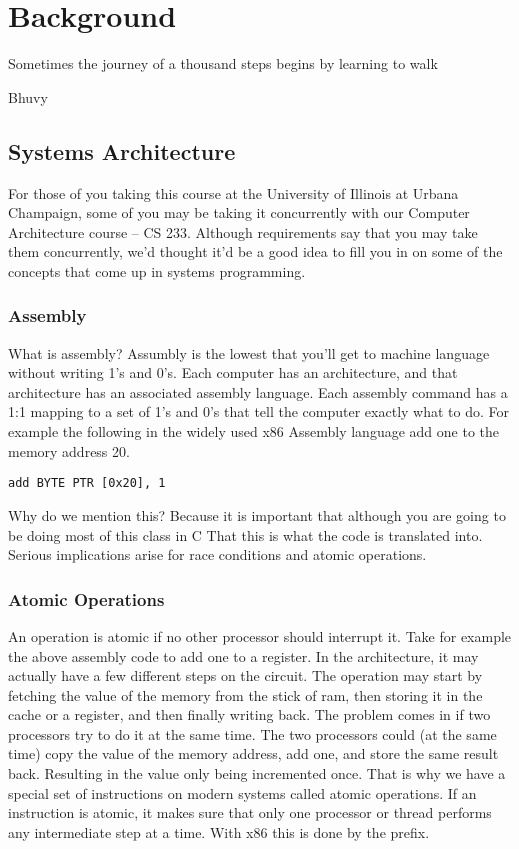 \chapter{Background}

\epigraph{Sometimes the journey of a thousand steps begins by learning to walk}{Bhuvy}

\section{Systems Architecture}

For those of you taking this course at the University of Illinois at Urbana Champaign, some of you may be taking it concurrently with our Computer Architecture course -- CS 233.
Although requirements say that you may take them concurrently, we'd thought it'd be a good idea to fill you in on some of the concepts that come up in systems programming.

\subsection{Assembly}

What is assembly? Assumbly is the lowest that you'll get to machine language without writing 1's and 0's.
Each computer has an architecture, and that architecture has an associated assembly language.
Each assembly command has a 1:1 mapping to a set of 1's and 0's that tell the computer exactly what to do.
For example the following in the widely used x86 Assembly language add one to the memory address 20.

\begin{verbatim}
add BYTE PTR [0x20], 1
\end{verbatim}

Why do we mention this? Because it is important that although you are going to be doing most of this class in C
That this is what the code is translated into.
Serious implications arise for race conditions and atomic operations.

\subsection{Atomic Operations}

An operation is atomic if no other processor should interrupt it. Take for example the above assembly code to add one to a register.
In the architecture, it may actually have a few different steps on the circuit.
The operation may start by fetching the value of the memory from the stick of ram, then storing it in the cache or a register, and then finally writing back.
The problem comes in if two processors try to do it at the same time.
The two processors could (at the same time) copy the value of the memory address, add one, and store the same result back.
Resulting in the value only being incremented once.
That is why we have a special set of instructions on modern systems called atomic operations.
If an instruction is atomic, it makes sure that only one processor or thread performs any intermediate step at a time.
With x86 this is done by the  prefix.

